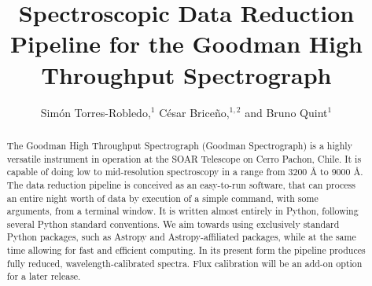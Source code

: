 \documentclass[11pt,twoside]{article}
\begin{document}
\title{Spectroscopic Data Reduction Pipeline for the Goodman High Throughput Spectrograph}

\author{Sim\'on Torres-Robledo,$^1$ C\'esar Brice\~no,$^{1, 2}$ and Bruno Quint$^1$
}


\begin{abstract}
The Goodman High Throughput Spectrograph (Goodman Spectrograph) is a highly
versatile instrument in operation at the SOAR Telescope on Cerro Pachon, Chile.
It is capable of doing low to mid-resolution spectroscopy in a range from 3200 \AA{}
to 9000 \AA{}. The data reduction pipeline is conceived as an easy-to-run software,
that can process an entire night worth of data by execution of a simple command,
with some arguments, from a terminal window. It is written almost entirely in
Python, following several Python standard conventions.
We aim towards using exclusively standard Python packages, such as Astropy and
Astropy-affiliated packages, while at the same time allowing for fast and
efficient computing.
In its present form the pipeline produces fully reduced, wavelength-calibrated
spectra. Flux calibration will be an add-on option for a later release.
\end{abstract}
\end{document}
